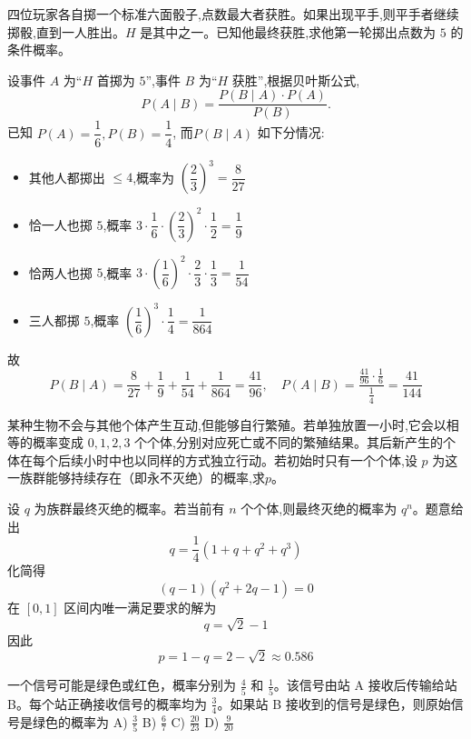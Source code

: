 \begin{questions}
    \question 四位玩家各自掷一个标准六面骰子,点数最大者获胜。如果出现平手,则平手者继续掷骰,直到一人胜出。$H$ 是其中之一。已知他最终获胜,求他第一轮掷出点数为 $5$ 的条件概率。
    \begin{solution}
        设事件 $A$ 为“$H$ 首掷为 $5$”,事件 $B$ 为“$H$ 获胜”,根据贝叶斯公式,
        \[
        P(A \mid B) = \frac{P(B \mid A) \cdot P(A)}{P(B)}.
        \]
        已知 $P(A) = \dfrac{1}{6}, P(B) = \dfrac{1}{4}$, 而$P(B \mid A)$ 如下分情况:
        \begin{itemize}
            \item 其他人都掷出 $\le 4$,概率为 $\left( \dfrac{2}{3} \right)^3 = \dfrac{8}{27}$
            \item 恰一人也掷 $5$,概率 $3 \cdot \dfrac{1}{6} \cdot \left( \dfrac{2}{3} \right)^2 \cdot \dfrac{1}{2} = \dfrac{1}{9}$
            \item 恰两人也掷 $5$,概率 $3 \cdot \left( \dfrac{1}{6} \right)^2 \cdot \dfrac{2}{3} \cdot \dfrac{1}{3} = \dfrac{1}{54}$
            \item 三人都掷 $5$,概率 $\left( \dfrac{1}{6} \right)^3 \cdot \dfrac{1}{4} = \dfrac{1}{864}$
        \end{itemize}
        故
        \[
        P(B \mid A) = \frac{8}{27} + \frac{1}{9} + \frac{1}{54} + \frac{1}{864} = \frac{41}{96} ,\quad
        P(A \mid B) = \frac{\frac{41}{96} \cdot \frac{1}{6}}{\frac{1}{4}} = \frac{41}{144}
        \]
    \end{solution}

    \question 某种生物不会与其他个体产生互动,但能够自行繁殖。若单独放置一小时,它会以相等的概率变成 $0,1,2,3$ 个个体,分别对应死亡或不同的繁殖结果。其后新产生的个体在每个后续小时中也以同样的方式独立行动。若初始时只有一个个体,设 $p$ 为这一族群能够持续存在（即永不灭绝）的概率,求$p$。
    \begin{solution}
        设 $q$ 为族群最终灭绝的概率。若当前有 $n$ 个个体,则最终灭绝的概率为 $q^n$。题意给出
        \[
        q = \frac14 \left(1 + q + q^2 + q^3\right)
        \]
        化简得
        \[
        (q-1)(q^2 + 2q - 1) = 0
        \]
        在 $[0,1]$ 区间内唯一满足要求的解为
        \[
        q = \sqrt{2} - 1
        \]
        因此
        \[
        p = 1 - q = 2 - \sqrt{2} \approx 0.586
        \]
    \end{solution}

    \question 一个信号可能是绿色或红色，概率分别为 $\frac{4}{5}$ 和 $\frac{1}{5}$。该信号由站 A 接收后传输给站 B。每个站正确接收信号的概率均为 $\frac{3}{4}$。如果站 B 接收到的信号是绿色，则原始信号是绿色的概率为
A) $\frac{3}{5}$ \qquad B) $\frac{6}{7}$ \qquad C) $\frac{20}{23}$ \qquad D) $\frac{9}{20}$


\end{questions}

